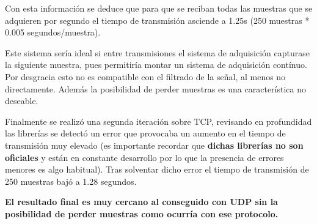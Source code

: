 Con esta información se deduce que para que se reciban todas las muestras que se adquieren por segundo el tiempo de transmisión asciende a 1.25s (250 muestras * 0.005 segundos/muestra).

Este sistema sería ideal si entre transmisiones el sistema de adquisición capturase la siguiente muestra, pues permitiría montar un sistema de adquisición contínuo. Por desgracia esto no es compatible con el filtrado de la señal, al menos no directamente. Además la posibilidad de perder muestras es una característica no deseable.

Finalmente se realizó una segunda iteración sobre TCP, revisando en profundidad las librerías se detectó un error que provocaba un aumento en el tiempo de transmisión muy elevado (es importante recordar que \textbf{dichas librerías no son oficiales} y están en constante desarrollo por lo que la presencia de errores menores es algo habitual). Tras solventar dicho error el tiempo de transmisión de 250 muestras bajó a 1.28 segundos.

\textbf{El resultado final es muy cercano al conseguido con UDP sin la posibilidad de perder muestras como ocurría con ese protocolo.}